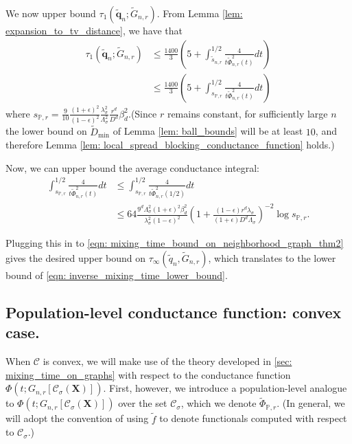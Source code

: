 \documentclass{article}
\newcommand{\1}{\mathbf{1}}
\newcommand{\qbf}{\mathbf{q}}
\newcommand{\Xbf}{\mathbf{X}}
\newcommand{\Pbb}{\mathbb{P}}
\newcommand{\Cset}{\mathcal{C}}
\newcommand{\Csig}{\Cset_{\sigma}}
\theoremstyle{aldenthm}
\begin{document}
We now upper bound $\tau_{1}(\widetilde{\qbf}_n; \widetilde{G}_{n,r})$.  From Lemma \ref{lem: expansion_to_tv_distance}, we have that
\begin{align}
\label{eqn: mixing_time_bound_on_neighborhood_graph_thm2}
\tau_{1}(\widetilde{\qbf}_n; \widetilde{G}_{n,r}) & \leq \frac{1400}{3}\left(5 + \int_{\widetilde{s}_{n,r}}^{1/2} \frac{4}{t\widetilde{\Phi}_{n,r}^2(t)} dt\right) \nonumber \\
& \leq \frac{1400}{3}\left(5 + \int_{ s_{\Pbb,r}}^{1/2} \frac{4}{t\widetilde{\Phi}_{n,r}^2(t)} dt \right)
\end{align}
where $s_{\Pbb,r} = \frac{9}{10} \frac{(1 + \epsilon)^2}{(1 - \epsilon)^2}\frac{\lambda_{\sigma}^2}{\Lambda_{\sigma}^2} \frac{r^d}{D^d} \beta_d^2$.(Since $r$ remains constant, for sufficiently large $n$ the lower bound on $\widetilde{D}_{\min}$ of Lemma \ref{lem: ball_bounds} will be at least $10$, and therefore Lemma \ref{lem: local_spread_blocking_conductance_function} holds.)

Now, we can upper bound the average conductance integral:
\begin{align*}
\int_{ s_{\Pbb,r}}^{1/2} \frac{4}{t\widetilde{\Phi}_{n,r}^2(t)} dt & \leq \int_{ s_{\Pbb,r}}^{1/2} \frac{4}{t\widetilde{\Phi}_{n,r}^2(1/2)} dt \\
& \leq 64\frac{9^d\Lambda_{\sigma}^2(1 + \epsilon)^2\beta_d^2}{\lambda_{\sigma}^2(1 - \epsilon)^2} \left(1 + \frac{(1 - \epsilon)r^d\lambda_{\sigma}}{(1 + \epsilon)D^d\Lambda_{\sigma}}\right)^{-2} \log s_{\Pbb,r}.
\end{align*}

Plugging this in to \eqref{eqn: mixing_time_bound_on_neighborhood_graph_thm2} gives the desired upper bound on $\tau_{\infty}(\widetilde{q}_n, \widetilde{G}_{n,r})$, which translates to the lower bound of \eqref{eqn: inverse_mixing_time_lower_bound}.

\subsection{Population-level conductance function: convex case.}
\label{sec: convex_population_conductance_function}

When $\Cset$ is convex, we will make use of the theory developed in \ref{sec: mixing_time_on_graphs} with respect to the conductance function $\Phi(t; G_{n,r}[\Csig(\Xbf)])$. First, however, we introduce a population-level analogue to $\Phi(t; G_{n,r}[\Csig(\Xbf)])$ over the set $\Csig$, which we denote $\widetilde{\Phi}_{\Pbb,r}$. (In general, we will adopt the convention of using $\widetilde{f}$ to denote functionals computed with respect to $\Csig$.)
\end{document}
